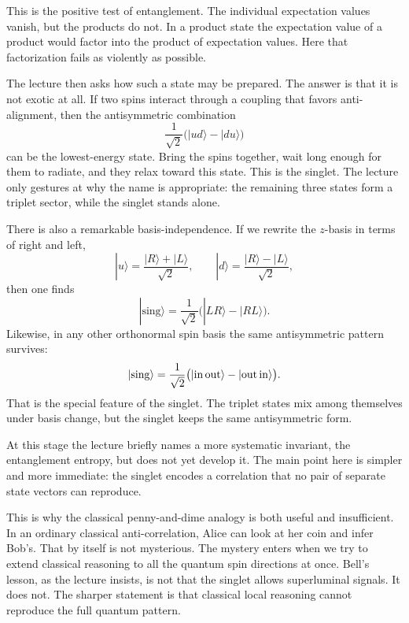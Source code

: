 This is the positive test of entanglement. The individual expectation values vanish, but the products do not. In a product state the expectation value of a product would factor into the product of expectation values. Here that factorization fails as violently as possible.

The lecture then asks how such a state may be prepared. The answer is that it is not exotic at all. If two spins interact through a coupling that favors anti-alignment, then the antisymmetric combination
\[
\frac{1}{\sqrt2}\bigl(|ud\rangle-|du\rangle\bigr)
\]
can be the lowest-energy state. Bring the spins together, wait long enough for them to radiate, and they relax toward this state. This is the singlet. The lecture only gestures at why the name is appropriate: the remaining three states form a triplet sector, while the singlet stands alone.

There is also a remarkable basis-independence. If we rewrite the \(z\)-basis in terms of right and left,
\begin{equation}
|u\rangle=\frac{|R\rangle+|L\rangle}{\sqrt2},
\qquad
|d\rangle=\frac{|R\rangle-|L\rangle}{\sqrt2},
\end{equation}
then one finds
\begin{equation}
|\mathrm{sing}\rangle
=
\frac{1}{\sqrt2}\bigl(|LR\rangle-|RL\rangle\bigr).
\end{equation}
Likewise, in any other orthonormal spin basis the same antisymmetric pattern survives:
\begin{equation}
|\mathrm{sing}\rangle
=
\frac{1}{\sqrt2}
\bigl(|{\rm in}\,{\rm out}\rangle-|{\rm out}\,{\rm in}\rangle\bigr).
\end{equation}
That is the special feature of the singlet. The triplet states mix among themselves under basis change, but the singlet keeps the same antisymmetric form.

At this stage the lecture briefly names a more systematic invariant, the entanglement entropy, but does not yet develop it. The main point here is simpler and more immediate: the singlet encodes a correlation that no pair of separate state vectors can reproduce.

This is why the classical penny-and-dime analogy is both useful and insufficient. In an ordinary classical anti-correlation, Alice can look at her coin and infer Bob's. That by itself is not mysterious. The mystery enters when we try to extend classical reasoning to all the quantum spin directions at once. Bell's lesson, as the lecture insists, is not that the singlet allows superluminal signals. It does not. The sharper statement is that classical local reasoning cannot reproduce the full quantum pattern.

